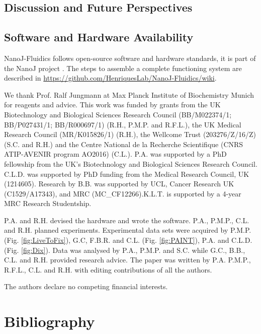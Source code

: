 \subsection*{Discussion and Future Perspectives}
\Blindtext

\subsection*{Software and Hardware Availability}
NanoJ-Fluidics follows open-source software and hardware standards, it is part of the NanoJ project \cite{gustafsson2016fast, culley2018quantitative,gray2016virusmapper}. The steps to assemble a complete functioning system are described in \href{https://github.com/HenriquesLab/NanoJ-Fluidics/wiki}{https://github.com/HenriquesLab/NanoJ-Fluidics/wiki}. 

\begin{acknowledgements}
    We thank Prof. Ralf Jungmann at Max Planck Institute of Biochemistry Munich for reagents and advice. This work was funded by grants from the UK Biotechnology and Biological Sciences Research Council (BB/M022374/1; BB/P027431/1; BB/R000697/1) (R.H., P.M.P. and R.F.L.), the UK Medical Research Council (MR/K015826/1) (R.H.), the Wellcome Trust (203276/Z/16/Z) (S.C. and R.H.) and the Centre National de la Recherche Scientifique (CNRS ATIP-AVENIR program AO2016) (C.L.). P.A. was supported by a PhD fellowship from the UK’s Biotechnology and Biological Sciences Research Council. C.L.D. was supported by PhD funding from the Medical Research Council, UK (1214605). Research by B.B. was supported by UCL, Cancer Research UK (C1529/A17343), and MRC (MC\_CF12266).K.L.T. is supported
    by a 4-year MRC Research Studentship.
\end{acknowledgements}


\begin{contributions}
    P.A. and R.H. devised the hardware and wrote the software. P.A., P.M.P., C.L. and R.H. planned experiments. Experimental data sets were acquired by P.M.P. (Fig. \ref{fig:LiveToFix}), G.C, F.B.R. and C.L. (Fig. \ref{fig:PAINT}), P.A. and C.L.D. (Fig. \ref{fig:Dix}). Data was analysed by P.A., P.M.P. and S.C. while G.C., B.B., C.L. and R.H. provided research advice. The paper was written by P.A. P.M.P., R.F.L., C.L. and R.H. with editing contributions of all the authors.
\end{contributions}

\begin{interests}
    The authors declare no competing financial interests.
\end{interests}

\section*{Bibliography}


